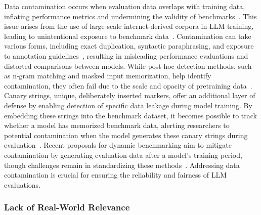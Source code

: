 Data contamination occurs when evaluation data overlaps with training data, inflating performance metrics and undermining the validity of benchmarks~\cite{xu2024benchmark}.
This issue arises from the use of large-scale internet-derived corpora in LLM training, leading to unintentional exposure to benchmark data~\cite{xu2024benchmark}. Contamination can take various forms, including exact duplication, syntactic paraphrasing, and exposure to annotation guidelines~\cite{chen2025recent, sainz2023nlp}, resulting in misleading performance evaluations and distorted comparisons between models. While post-hoc detection methods, such as n-gram matching and masked input memorization, help identify contamination, they often fail due to the scale and opacity of pretraining data~\cite{chen2025recent, deng2023investigating, wu2024antileakbench}.
Canary strings, unique, deliberately inserted markers, offer an additional layer of defense by enabling detection of specific data leakage during model training.
By embedding these strings into the benchmark dataset, it becomes possible to track whether a model has memorized benchmark data, alerting researchers to potential contamination when the model generates these canary strings during evaluation~\cite{roberts2023data, ishida2025can}.
Recent proposals for dynamic benchmarking aim to mitigate contamination by generating evaluation data after a model's training period, though challenges remain in standardizing these methods~\cite{chen2025recent, zhu2023dyval, zhu2024dyval, chen2025dynamic}.
Addressing data contamination is crucial for ensuring the reliability and fairness of LLM evaluations.

\subsubsection{Lack of Real-World Relevance}
\label{subsec:benchmarks-limits-relev}

